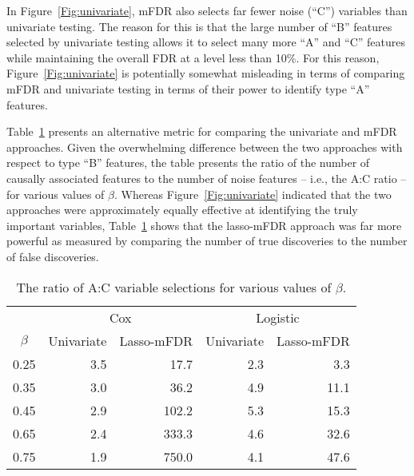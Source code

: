 
In Figure~\ref{Fig:univariate}, mFDR also selects far fewer noise (``C'') variables than univariate testing.  The reason for this is that the large number of ``B'' features selected by univariate testing allows it to select many more ``A'' and ``C'' features while maintaining the overall FDR at a level less than 10\%.  For this reason, Figure~\ref{Fig:univariate} is potentially somewhat misleading in terms of comparing mFDR and univariate testing in terms of their power to identify type ``A'' features.

Table~\ref{Tab:univariate} presents an alternative metric for comparing the univariate and mFDR approaches.  Given the overwhelming difference between the two approaches with respect to type ``B'' features, the table presents the ratio of the number of causally associated features to the number of noise features -- i.e., the A:C ratio -- for various values of $\beta$.  Whereas Figure~\ref{Fig:univariate} indicated that the two approaches were approximately equally effective at identifying the truly important variables, Table~\ref{Tab:univariate} shows that the lasso-mFDR approach was far more powerful as measured by comparing the number of true discoveries to the number of false discoveries.

\begin{table}[b!]
\centering
\begin{tabular}{c | r r r r}
  \hline
  & \multicolumn{2}{c}{Cox} & \multicolumn{2}{c}{Logistic}\\
 $\beta$ & Univariate & Lasso-mFDR & Univariate & Lasso-mFDR \\ 
  \hline
  0.25 & 3.5 & 17.7 & 2.3 & 3.3 \\ 
  0.35 & 3.0 & 36.2 & 4.9 & 11.1 \\ 
  0.45 & 2.9 & 102.2 & 5.3 & 15.3 \\ 
  0.65 & 2.4 & 333.3 & 4.6 & 32.6 \\ 
  0.75 & 1.9 & 750.0 & 4.1 & 47.6 \\ 
   \hline
\end{tabular}
\caption{\label{Tab:univariate} The ratio of A:C variable selections for various values of $\beta$.}
\end{table}

